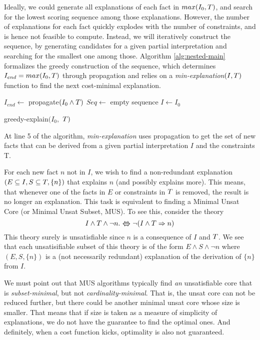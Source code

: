 Ideally, we could generate all explanations of each fact in $max(I_0,T)$, and search for the lowest scoring sequence among those explanations.
However, the number of explanations for each fact quickly explodes with the number of constraints, and is hence not feasible to compute.
Instead, we will iteratively construct the sequence, by generating candidates for a given partial interpretation and searching for the smallest one among those.
Algorithm \ref{alg:nested-main} formalizes the greedy construction of the sequence, which determines $I_{end} = max(I_0,T)$  through propagation and relies on a \textit{min-explanation$(I,T)$} function to find the next cost-minimal explanation.

\begin{algorithm}[ht]
    $I_{end} \gets$ propagate$(I_0\land T)$\;
    $Seq \gets$ empty sequence\;
    $I \gets I_0$\;
    \caption{greedy-explain$(I_0,$ $T)$}
    \label{alg:nested-main}
  \end{algorithm}

At line 5 of the algorithm, \textit{min-explanation} uses propagation to get the set of new facts that can be derived from a given partial interpretation $I$ and the constraints T. 

For each new fact $n$ not in $I$, we wish to find a non-redundant explanation $(E \subseteq I, S \subseteq T,\{n\})$ that explains $n$ (and possibly explains more).
This means, that whenever one of the facts in $E$ or constraints in $T$ is removed, the result is no longer an explanation. This task is equivalent to finding a Minimal Unsat Core (or Minimal Unsat Subset, MUS). To see this, consider the theory
\[ I\wedge \allconstraints \wedge \lnot n. \xLleftRrightarrow{} \lnot (I \wedge T \Rightarrow n) \]
This theory surely is unsatisfiable since $n$ is a consequence of $I$ and $T$. We see that each unsatisifiable subset of this theory is of the form $E \wedge S \wedge \lnot n$ where $(E,S,\{n\})$ is a (not necessarily redundant) explanation of the derivation of $\{n\}$ from $I$.

We must point out that MUS algorithms typically find \textit{an} unsatisfiable core that is \textit{subset-minimal}, but not \textit{cardinality-minimal}. That is, the unsat core can not be reduced further, but there could be another minimal unsat core whose size is smaller.
That means that if size is taken as a measure of simplicity of explanations, we do not have the guarantee to find the optimal ones. 
And definitely, when a cost function kicks, optimality is also not guaranteed.

